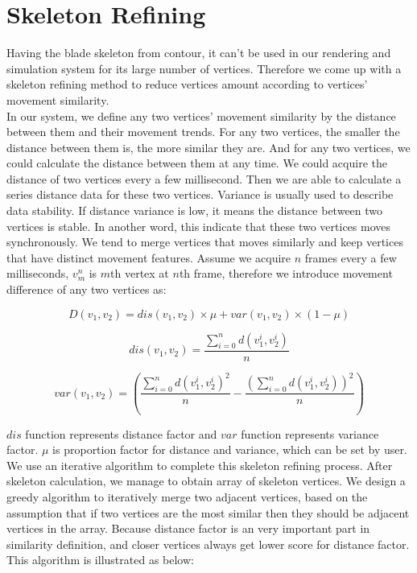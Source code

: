 \documentclass[10pt,journal,compsoc]{IEEEtran}
\begin{document}
\section{Skeleton Refining}\label{sec:Refining}
Having the blade skeleton from contour, it can't be used in our rendering and simulation system for its large number of vertices. Therefore we come up with a skeleton refining method to reduce vertices amount according to vertices' movement similarity.\\

In our system, we define any two vertices' movement similarity by the distance between them and their movement trends. For any two vertices, the smaller the distance between them is, the more similar they are. And for any two vertices, we could calculate the distance between them at any time. We could acquire the distance of two vertices every a few millisecond. Then we are able to calculate a series distance data for these two vertices. Variance is usually used to describe data stability. If distance variance is low, it means the distance between two vertices is stable. In another word, this indicate that these two vertices moves synchronously. We tend to merge vertices that moves similarly and keep vertices that have distinct movement features. Assume we acquire $n$ frames every a few milliseconds, $v_{m}^{n}$ is $m$th vertex at $n$th frame, therefore we introduce movement difference of any two vertices as:

\begin{equation}
D(v_{1}, v_{2}) = dis(v_{1}, v_{2})\times \mu + var(v_{1}, v_{2}) \times (1-\mu)
\label{eq:similarityeq}
\end{equation}

\begin{equation}
dis(v_{1}, v_{2}) = \dfrac{\sum_{i = 0}^{n}{d(v_{1}^{i}, v_{2}^{i})}}{n}
\label{eq:distance}
\end{equation}

\begin{equation}
var(v_{1}, v_{2}) = (\dfrac{\sum_{i = 0}^{n}{d(v_{1}^{i}, v_{2}^{i})}^{2}}{n} - \dfrac{(\sum_{i = 0}^{n}{d(v_{1}^{i}, v_{2}^{i})})^{2}}{n})
\label{eq:variance}
\end{equation}

$dis$ function represents distance factor and $var$ function represents variance factor. $\mu$ is proportion factor for distance and variance, which can be set by user.\\

We use an iterative algorithm to complete this skeleton refining process. After skeleton calculation, we manage to obtain array of skeleton vertices. We design a greedy algorithm to iteratively merge two adjacent vertices, based on the assumption that if two vertices are the most similar then they should be adjacent vertices in the array. Because distance factor is an very important part in similarity definition, and closer vertices always get lower score for distance factor. This algorithm is illustrated as below:\\
\end{document}
